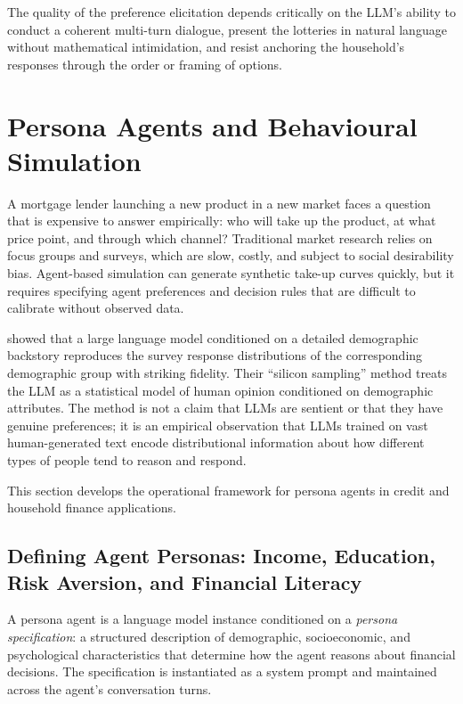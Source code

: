 \begin{context}
The quality of the preference elicitation depends critically on the LLM's ability to conduct a coherent multi-turn dialogue, present the lotteries in natural language without mathematical intimidation, and resist anchoring the household's responses through the order or framing of options.

\end{context}

\section{Persona Agents and Behavioural Simulation}
\label{sec:persona-agents}

\begin{context}

A mortgage lender launching a new product in a new market faces a question that is expensive to answer empirically: who will take up the product, at what price point, and through which channel? Traditional market research relies on focus groups and surveys, which are slow, costly, and subject to social desirability bias. Agent-based simulation can generate synthetic take-up curves quickly, but it requires specifying agent preferences and decision rules that are difficult to calibrate without observed data.

\citet{argyle2023out} showed that a large language model conditioned on a detailed demographic backstory reproduces the survey response distributions of the corresponding demographic group with striking fidelity. Their ``silicon sampling'' method treats the LLM as a statistical model of human opinion conditioned on demographic attributes. The method is not a claim that LLMs are sentient or that they have genuine preferences; it is an empirical observation that LLMs trained on vast human-generated text encode distributional information about how different types of people tend to reason and respond.

This section develops the operational framework for persona agents in credit and household finance applications.

\subsection{Defining Agent Personas: Income, Education, Risk Aversion, and Financial Literacy}
\label{subsec:persona-design}

A persona agent is a language model instance conditioned on a \emph{persona specification}: a structured description of demographic, socioeconomic, and psychological characteristics that determine how the agent reasons about financial decisions. The specification is instantiated as a system prompt and maintained across the agent's conversation turns.


\end{context}
